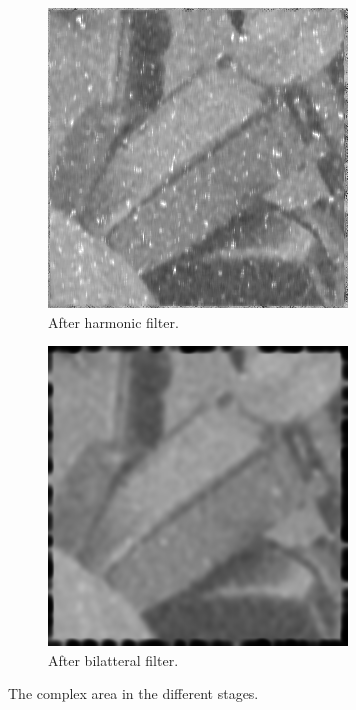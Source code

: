 \begin{figure}[H]
  \begin{subfigure}{\cutOutWidth}
  \centering
    \includegraphics[width = \linewidth]{graphics/complex2_harmonic.png}
    \caption{After harmonic filter.}
    \label{fig:complex2_harmonic}
  \end{subfigure}
  \begin{subfigure}{\cutOutWidth}
  \centering
    \includegraphics[width = \linewidth]{graphics/complex2_bilatteral.png}
    \caption{After bilatteral filter.}
    \label{fig:complex2_bilatteral}
  \end{subfigure}
  \caption{The complex area in the different stages.}
\end{figure}

